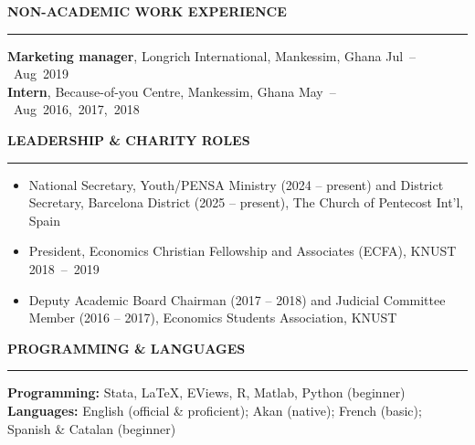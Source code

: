 \documentclass{resume} %
\def\sectionskip{\vspace{4pt}}
\def\sectionlineskip{\smallskip}
\renewenvironment{rSection}[1]{%
  \sectionskip
  \MakeUppercase{{\bf #1}}%
  \sectionlineskip
  \hrule
  \begin{list}{}{\setlength{\leftmargin}{0em}\setlength{\topsep}{5pt}\setlength{\itemsep}{0pt}\setlength{\parsep}{0pt}}%
  \item[]
}{%
  \end{list}
}
\newcommand{\when}[1]{\hfill\mbox{#1}}
\begin{document}
\begin{rSection}{Non-Academic Work Experience}
\textbf{Marketing manager}, Longrich International, Mankessim, Ghana \when{Jul -- Aug 2019}\\
\textbf{Intern}, Because-of-you Centre, Mankessim, Ghana \when{May -- Aug 2016, 2017, 2018}
\end{rSection}


\begin{rSection}{Leadership \& Charity Roles}
\begin{itemize}
\item National Secretary, Youth/PENSA Ministry (2024 -- present) and District Secretary, Barcelona District (2025 -- present), The Church of Pentecost Int'l, Spain
\item President, Economics Christian Fellowship and Associates (ECFA), KNUST \when{2018 -- 2019}
\item Deputy Academic Board Chairman (2017 -- 2018) and Judicial Committee Member (2016 -- 2017), Economics Students Association, KNUST
\end{itemize}
\end{rSection}


\begin{rSection}{Programming \& Languages}
\textbf{Programming:} Stata, LaTeX, EViews, R, Matlab, Python (beginner)\\
\textbf{Languages:} English (official \& proficient); Akan (native); French (basic); Spanish \& Catalan \mbox{(beginner)}
\end{rSection}
\end{document}
